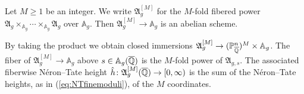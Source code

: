 


Let $M\ge 1$ be an integer. We write $\mathfrak{A}_g^{[M]}$ for the
$M$-fold fibered power
$\mathfrak{A}_g\times_{\mathbb{A}_g} \cdots \times_{\mathbb{A}_g}\mathfrak{A}_g$
over $\mathbb{A}_g$.
Then $\mathfrak{A}_g^{[M]}\rightarrow \mathbb{A}_g$ is an abelian
scheme.


By taking the product we obtain closed
immersions $\mathfrak{A}_g^{[M]}\rightarrow ({\mathbb{P}}_{\overline{\mathbb{Q}}}^n)^{M}\times
\mathbb{A}_g$. The fiber of $\mathfrak{A}_g^{[M]}\rightarrow
\mathbb{A}_g$ above $s\in \mathbb{A}_g({\overline{\mathbb{Q}}})$ is the $M$-fold power of
$\mathfrak{A}_{g,s}$. The associated fiberwise N\'eron--Tate height
$\hat h \colon \mathfrak{A}_g^{[M]}({\overline{\mathbb{Q}}})\rightarrow [0,\infty)$ is
the sum of the N\'eron--Tate heights, as in (\ref{eq:NTfinemoduli}),
of the $M$ coordinates.%

